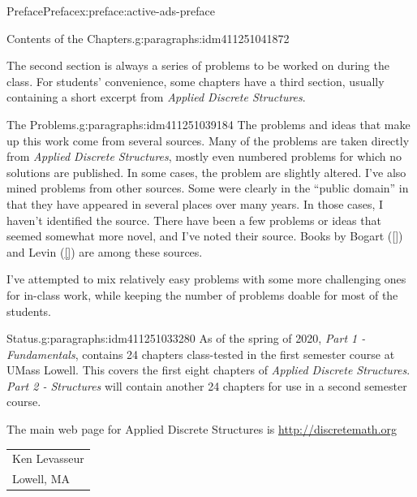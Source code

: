 \documentclass[oneside,10pt,]{book}
\newcommand{\xreffont}{\relax}
\numberwithin{equation}{section}
\begin{document}
\begin{preface}{Preface}{}{Preface}{}{}{x:preface:active-ads-preface}
\begin{paragraphs}{Contents of the Chapters.}{g:paragraphs:idm411251041872}
\par
The second section is always a series of problems to be worked on during the class. For students' convenience, some chapters have a third section, usually containing a short excerpt from \emph{Applied Discrete Structures}.%
\end{paragraphs}%
\begin{paragraphs}{The Problems.}{g:paragraphs:idm411251039184}%
The problems and ideas that make up this work come from several sources.  Many of the problems are taken directly from \emph{Applied Discrete Structures}, mostly even numbered problems for which no solutions are published. In some cases, the problem are slightly altered.  I've also mined problems from other sources.  Some were clearly in the ``public domain'' in that they have appeared in several places over many years.  In those cases, I haven't identified the source.   There have been a few problems or ideas that seemed somewhat more novel, and I've noted their source. Books by Bogart (\hyperlink{x:biblio:biblio-bogart-2017}{[{\xreffont 1}]}) and Levin (\hyperlink{x:biblio:biblio-levin-2020}{[{\xreffont 3}]}) are among these sources.%
\par
I've attempted to mix relatively easy problems with some more challenging ones for in-class work, while keeping the number of problems doable for most of the students.%
\end{paragraphs}%
\begin{paragraphs}{Status.}{g:paragraphs:idm411251033280}%
As of the spring of 2020, \emph{Part 1 - Fundamentals}, contains 24 chapters class-tested in the first semester course at UMass Lowell. This covers the first eight chapters of \emph{Applied Discrete Structures}. \emph{Part 2 - Structures} will contain another 24 chapters for use in a second semester course.%
\end{paragraphs}%
\par
The main web page for Applied Discrete Structures is \url{http://discretemath.org}%
\nopagebreak\par%
\hfill\begin{tabular}[t]{l@{}}
Ken Levasseur\\
Lowell, MA
\end{tabular}\\\par
\end{preface}
\setcounter{tocdepth}{0}
\renewcommand*\contentsname{Contents}
\tableofcontents
\end{document}
